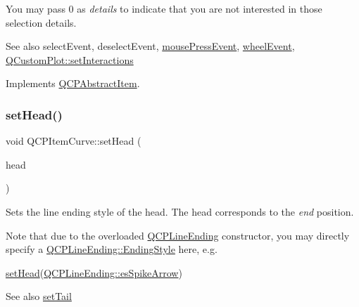 You may pass 0 as {\itshape details} to indicate that you are not interested in those selection details.

\begin{DoxySeeAlso}{See also}
select\+Event, deselect\+Event, \mbox{\hyperlink{class_q_c_p_layerable_af6567604818db90f4fd52822f8bc8376}{mouse\+Press\+Event}}, \mbox{\hyperlink{class_q_c_p_layerable_a47dfd7b8fd99c08ca54e09c362b6f022}{wheel\+Event}}, \mbox{\hyperlink{class_q_custom_plot_a5ee1e2f6ae27419deca53e75907c27e5}{Q\+Custom\+Plot\+::set\+Interactions}} 
\end{DoxySeeAlso}


Implements \mbox{\hyperlink{class_q_c_p_abstract_item_ae41d0349d68bb802c49104afd100ba2a}{Q\+C\+P\+Abstract\+Item}}.

\mbox{\label{class_q_c_p_item_curve_a08a30d9cdd63995deea3d9e20430676f}} 
\subsubsection{\texorpdfstring{set\+Head()}{setHead()}}
{\footnotesize\ttfamily void Q\+C\+P\+Item\+Curve\+::set\+Head (\begin{DoxyParamCaption}\item[{const \mbox{\hyperlink{class_q_c_p_line_ending}{Q\+C\+P\+Line\+Ending}} \&}]{head }\end{DoxyParamCaption})}

Sets the line ending style of the head. The head corresponds to the {\itshape end} position.

Note that due to the overloaded \mbox{\hyperlink{class_q_c_p_line_ending}{Q\+C\+P\+Line\+Ending}} constructor, you may directly specify a \mbox{\hyperlink{class_q_c_p_line_ending_a5ef16e6876b4b74959c7261d8d4c2cd5}{Q\+C\+P\+Line\+Ending\+::\+Ending\+Style}} here, e.\+g.
\begin{DoxyCode}
\mbox{\hyperlink{class_q_c_p_item_curve_a08a30d9cdd63995deea3d9e20430676f}{setHead}}(\mbox{\hyperlink{class_q_c_p_line_ending_a5ef16e6876b4b74959c7261d8d4c2cd5ab9964d0d03f812d1e79de15edbeb2cbf}{QCPLineEnding::esSpikeArrow}}) 
\end{DoxyCode}


\begin{DoxySeeAlso}{See also}
\mbox{\hyperlink{class_q_c_p_item_curve_ac3488d8b1a6489c845dc5bff3ef71124}{set\+Tail}} 
\end{DoxySeeAlso}
\mbox{\label{class_q_c_p_item_curve_a034be908440aec785c34b92843461221}} 
